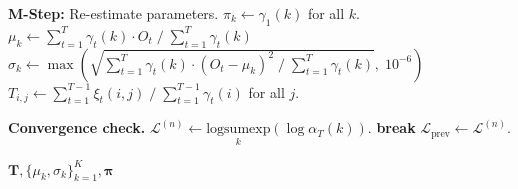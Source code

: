 \begin{algorithm}[tp]
\begin{algorithmic}[1]
    \STATE \textbf{M-Step:} Re-estimate parameters.
    \STATE $\pi_k \leftarrow \gamma_1(k)$ for all $k$.
        \STATE $\mu_k \leftarrow \sum_{t=1}^T \gamma_t(k) \cdot O_t \;/\; \sum_{t=1}^T \gamma_t(k)$
        \STATE $\sigma_k \leftarrow \max\!\left(\sqrt{\sum_{t=1}^T \gamma_t(k) \cdot (O_t - \mu_k)^2 \;/\; \sum_{t=1}^T \gamma_t(k)},\; 10^{-6}\right)$
    \ENDFOR
        \STATE $T_{i,j} \leftarrow \sum_{t=1}^{T-1} \xi_t(i,j) \;/\; \sum_{t=1}^{T-1} \gamma_t(i)$ for all $j$.
    \ENDFOR

    \STATE \textbf{Convergence check.}
    \STATE $\mathcal{L}^{(n)} \leftarrow \underset{k}{\text{logsumexp}}(\log \alpha_T(k))$.
        \STATE \textbf{break}
    \ENDIF
    \STATE $\mathcal{L}_{\text{prev}} \leftarrow \mathcal{L}^{(n)}$.
\ENDFOR

\RETURN $\mathbf{T}, \{\mu_k, \sigma_k\}_{k=1}^K, \boldsymbol{\pi}$
\end{algorithmic}
\end{algorithm}

